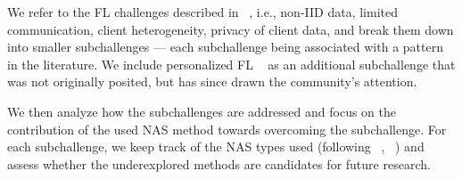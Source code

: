 We refer to the FL challenges described in ~\cite{fl_seminal_2017}, i.e., non-IID data, limited communication, client heterogeneity, privacy of client data, and break them down into smaller subchallenges — each subchallenge being associated with a pattern in the literature. We include personalized FL ~\cite{personalized_fl_2023} as an additional subchallenge that was not originally posited, but has since drawn the community's attention. 

We then analyze how the subchallenges are addressed and focus on the contribution of the used NAS method towards overcoming the subchallenge. For each subchallenge, we keep track of the NAS types used (following ~\cite{nas_1000_papers_2023}, ~\cite{systematic_nas_survey_2024}) and assess whether the underexplored methods are candidates for future research.
